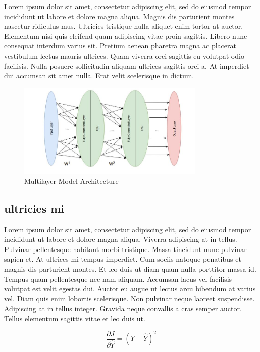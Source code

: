 \documentclass{cup-ino}
\begin{document}
Lorem ipsum dolor sit amet, consectetur adipiscing elit, sed do eiusmod tempor incididunt ut labore et dolore magna aliqua. Magnis dis parturient montes nascetur ridiculus mus. Ultricies tristique nulla aliquet enim tortor at auctor. Elementum nisi quis eleifend quam adipiscing vitae proin sagittis. Libero nunc consequat interdum varius sit. Pretium aenean pharetra magna ac placerat vestibulum lectus mauris ultrices. Quam viverra orci sagittis eu volutpat odio facilisis. Nulla posuere sollicitudin aliquam ultrices sagittis orci a. At imperdiet dui accumsan sit amet nulla. Erat velit scelerisque in dictum.

\begin{figure}[h!]
\centering
\includegraphics[width=0.8\textwidth]{images/multilayer.jpeg}
\caption{Multilayer Model Architecture}
\label{fig:multilayer}
\end{figure}

\subsection{ultricies mi}
Lorem ipsum dolor sit amet, consectetur adipiscing elit, sed do eiusmod tempor incididunt ut labore et dolore magna aliqua. Viverra adipiscing at in tellus. Pulvinar pellentesque habitant morbi tristique. Massa tincidunt nunc pulvinar sapien et. At ultrices mi tempus imperdiet. Cum sociis natoque penatibus et magnis dis parturient montes. Et leo duis ut diam quam nulla porttitor massa id. Tempus quam pellentesque nec nam aliquam. Accumsan lacus vel facilisis volutpat est velit egestas dui. Auctor eu augue ut lectus arcu bibendum at varius vel. Diam quis enim lobortis scelerisque. Non pulvinar neque laoreet suspendisse. Adipiscing at in tellus integer. Gravida neque convallis a cras semper auctor. Tellus elementum sagittis vitae et leo duis ut.

\begin{equation} 
\label{sqrd_err_grad}
\frac{\partial J}{\partial \hat{Y}} = (Y-\hat{Y})^2
\end{equation}
\end{document}
